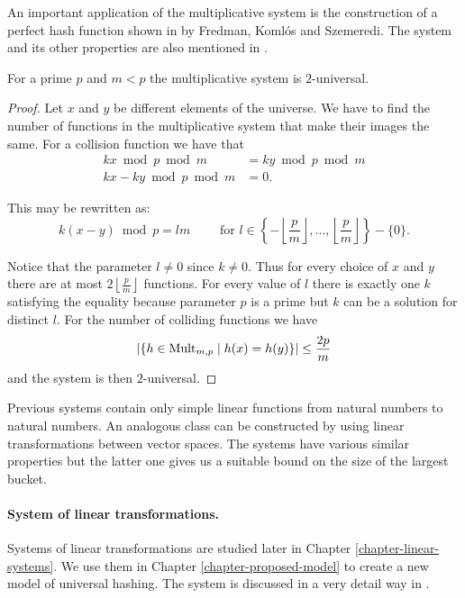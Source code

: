 An important application of the multiplicative system is the construction of a perfect hash function shown in \cite{1884} by Fredman, Koml\'os and Szemeredi. The system and its other properties are also mentioned in \cite{DBLP:books/sp/MehlhornS2008}.

\begin{remark}
For a prime $p$ and $m < p$ the multiplicative system is $2$-universal.
\end{remark}
\begin{proof}
Let $x$ and $y$ be different elements of the universe. We have to find the number of functions in the multiplicative system that make their images the same. For a collision function we have that
\begin{displaymath}
\begin{split}
kx \bmod p \bmod m & = ky \bmod p \bmod m \\
kx - ky \bmod p \bmod m & = 0 \text{.}
\end{split}
\end{displaymath}

This may be rewritten as:
\begin{displaymath}
k(x - y) \bmod p = l m \qquad \text{ for  } l \in \left\lbrace -\left\lfloor\frac{p}{m}\right\rfloor, \dots, \left\lfloor\frac{p}{m}\right\rfloor \right\rbrace - \{0\} \text{.}
\end{displaymath}

Notice that the parameter $l \neq 0$ since $k \neq 0$. Thus for every choice of $x$ and $y$ there are at most $2\left\lfloor\frac{p}{m}\right\rfloor$ functions. For every value of $l$ there is exactly one $k$ satisfying the equality because parameter $p$ is a prime but $k$ can be a solution for distinct $l$. For the number of colliding functions we have \[ | \lbrace h \in \mathrm{Mult}_{m,p} \mid h(x) = h(y) \rbrace | \leq \frac{2p}{m} \] and the system is then $2$-universal.
\end{proof}

Previous systems contain only simple linear functions from natural numbers to natural numbers. An analogous class can be constructed by using linear transformations between vector spaces. The systems have various similar properties but the latter one gives us a suitable bound on the size of the largest bucket. 

\paragraph{System of linear transformations.} 
Systems of linear transformations are studied later in Chapter \ref{chapter-linear-systems}. We use them in Chapter \ref{chapter-proposed-model} to create a new model of universal hashing. The system is discussed in a very detail way in \cite{DBLP:journals/jacm/AlonDMPT99}.

